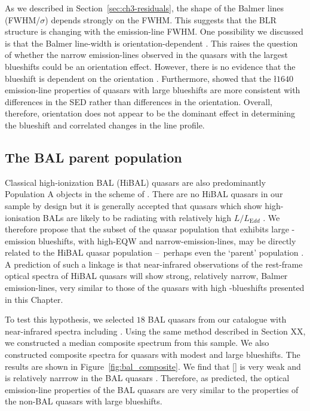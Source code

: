 As we described in Section~\ref{sec:ch3-residuals}, the shape of the Balmer lines (FWHM/$\sigma$) depends strongly on the FWHM. 
This suggests that the BLR structure is changing with the emission-line FWHM. 
One possibility we discussed is that the Balmer line-width is orientation-dependent \citep[e.g.][]{shen14}. 
This raises the question of whether the narrow \ha emission-lines observed in the quasars with the largest  blueshifts could be an orientation effect. 
However, there is no evidence that the  blueshift is dependent on the orientation \citep[inferred from the radio core-dominance;][]{richards11,runnoe14}. 
Furthermore, \citet{leighly04} showed that the \l$1640$ emission-line properties of quasars with large  blueshifts are more consistent with differences in the SED rather than differences in the orientation.
Overall, therefore, orientation does not appear to be the dominant effect in determining the  blueshift and correlated changes in the \ha line profile.

\subsection{The BAL parent population}

Classical high-ionization BAL (HiBAL) quasars are also predominantly Population A objects in the scheme of \citet{sulentic00b}. 
There are no HiBAL quasars in our sample by design but it is generally accepted that quasars which show high-ionisation BALs are likely to be radiating with relatively high $L/L_{\mathrm Edd}$ \citep[e.g.][]{zhang14}. 
We therefore propose that the subset of the quasar population that exhibits large -emission blueshifts, with high-EQW and narrow-\ha emission-lines, may be directly related to the HiBAL quasar population \---\ perhaps even the `parent' population \citep{richards06conf}. 
A prediction of such a linkage is that near-infrared observations of the rest-frame optical spectra of HiBAL quasars will show strong, relatively narrow, Balmer emission-lines, very similar to those of the quasars with high -blueshifts presented in this Chapter. 

To test this hypothesis, we selected $18$  BAL quasars from our catalogue with near-infrared spectra including \hb. 
Using the same method described in Section XX, we constructed a median composite spectrum from this sample. 
We also constructed composite spectra for quasars with modest and large  blueshifts. 
The results are shown in Figure~\ref{fig:bal_composite}. 
We find that [] is very weak and \hb is relatively narrrow in the BAL quasars \citep[e.g.][]{yuan03}. 
Therefore, as predicted, the optical emission-line properties of the BAL quasars are very similar to the properties of the non-BAL quasars with large  blueshifts. 

